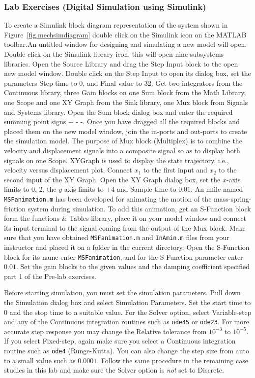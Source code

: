 \subsubsection{Lab Exercises (Digital Simulation using Simulink)}
To create a Simulink block diagram representation of the system shown in Figure~\ref{fig.mechsimdiagram} double click on the Simulink icon on the MATLAB toolbar.An untitled window for designing
and simulating a new model will open. Double click on the Simulink library icon, this will open
nine subsystems libraries. Open the Source Library and drag the Step Input block to the open new
model window. Double click on the Step Input to open its dialog box, set the parameters Step time
to 0, and Final value to 32. Get two integrators from the Continuous library, three Gain blocks
on one Sum block from the Math Library, one Scope and one XY Graph from the Sink library,
one Mux block from Signals and Systems library. Open the Sum block dialog box and enter the
required summing point signs + - -. Once you have dragged all the required blocks and placed
them on the new model window, join the in-ports and out-ports to create the simulation model.
The purpose of Mux block (Multiplex) is to combine the velocity and displacement signals into a
composite signal so as to display both signals on one Scope. XYGraph is used to display the state
trajectory, i.e., velocity versus displacement plot. Connect $x_1$ to the first input and $x_2$ to the second
input of the XY Graph. Open the XY Graph dialog box, set the $x$-axis limits to 0, 2, the $y$-axis
limits to $\pm4$ and Sample time to $0.01$. An mfile named \texttt{MSFanimation.m} has been developed for
animating the motion of the mass-spring-friction system during simulation. To add this animation,
get an S-Function block form the functions \& Tables library, place it on your model window and
connect its input terminal to the signal coming from the output of the Mux block. Make sure that
you have obtained \texttt{MSFanimation.m} and \texttt{InAmin.m} files from your instructor and placed it on a
folder in the current directory. Open the S-Function block for its name enter \texttt{MSFanimation}, and
for the S-Function parameter enter $0.01$.
Set the gain blocks to the given values and the damping coefficient specified part 1 of the Pre-lab exercises.
\par
Before starting simulation, you must set the simulation parameters.  Pull down the Simulation dialog box and select Simulation Parameters.  Set the start time to 0 and the stop time to a suitable value.  For the Solver option, select Variable-step and any of the Continuous integration routines such as \texttt{ode45} or \texttt{ode23}.  For more accurate step response you may change the Relative tolerance from $10^{-3}$ to $10^{-5}$.  If you select Fixed-step, again make sure you select a Continuous integration routine such as \texttt{ode4} (Runge-Kutta).  You can also change the step size from auto to a small value such as $0.0001$.  Follow the same procedure in the remaining case studies in this lab and make sure the Solver option is \textit{not} set to Discrete.
